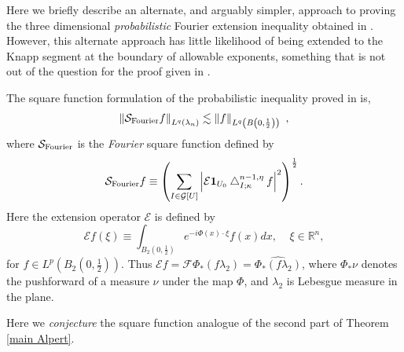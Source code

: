 \documentclass{amsart}%
\theoremstyle{plain}
\numberwithin{equation}{section}
\begin{document}
Here we briefly describe an alternate, and arguably simpler, approach to
proving the three dimensional \emph{probabilistic} Fourier extension
inequality obtained in \cite{Saw7}. However, this alternate approach has
little likelihood of being extended to the Knapp segment at the boundary of
allowable exponents, something that is not out of the question for the proof
given in \cite{Saw7}.

The square function formulation of the probabilistic inequality proved in
\cite{Saw7} is,%
\begin{equation}
\left\Vert \mathcal{S}_{\mathop{\rm Fourier}}f\right\Vert _{L^{q}\left(
\lambda_{n}\right)  }\lesssim\left\Vert f\right\Vert _{L^{q}\left(  B\left(
0,\frac{1}{2}\right)  \right)  }\ ,\label{prob ext square}%
\end{equation}
where $\mathcal{S}_{\mathop{\rm Fourier}}$ is the \emph{Fourier} square
function defined by%
\begin{equation}
\mathcal{S}_{\mathop{\rm Fourier}}f\equiv\left(  \sum_{I\in\mathcal{G}\left[
U\right]  }\left\vert \mathcal{E}\mathbf{1}_{U_{0}}\bigtriangleup_{I;\kappa
}^{n-1,\eta}f\right\vert ^{2}\right)  ^{\frac{1}{2}}.\label{def T square}%
\end{equation}
Here the extension operator $\mathcal{E}$ is defined by%
\begin{equation}
\mathcal{E}f\left(  \xi\right)  \equiv\int_{B_{2}\left(  0,\frac{1}{2}\right)
}e^{-i\Phi\left(  x\right)  \cdot\xi}f\left(  x\right)  dx,\ \ \ \ \ \xi
\in\mathbb{R}^{n},\label{def T}%
\end{equation}
for $f\in L^{p}\left(  B_{2}\left(  0,\frac{1}{2}\right)  \right)  $. Thus
$\mathcal{E}f=\mathcal{F}\Phi_{\ast}\left(  f\lambda_{2}\right)
=\widehat{\Phi_{\ast}\left(  f\lambda_{2}\right)  }$, where $\Phi_{\ast}\nu$
denotes the pushforward of a measure $\nu$ under the map $\Phi$, and
$\lambda_{2}$ is Lebesgue measure in the plane.

Here we \emph{conjecture} the square function analogue of the second part of
Theorem \ref{main Alpert}.
\end{document}
